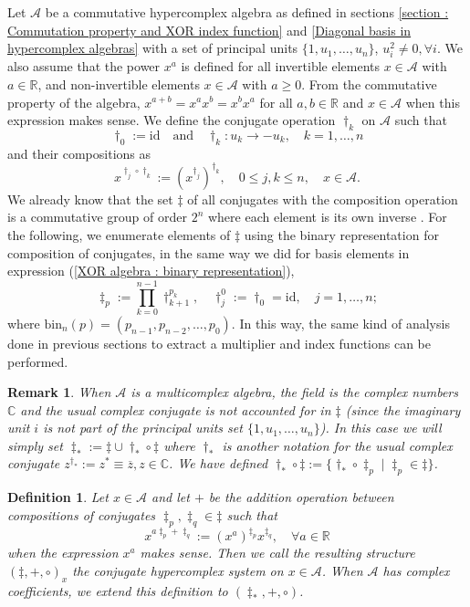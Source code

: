 \documentclass{article}
\newtheorem{definition}[theorem]{Definition}
\newtheorem{remark}[theorem]{Remark}
\begin{document}
Let $\mathcal{A}$ be a commutative hypercomplex algebra as defined in sections \ref{section : Commutation property and XOR index function} and \ref{Diagonal basis in hypercomplex algebras} with a set of principal units $\{1,u_1,\ldots,u_n\}$, $u_i^2 \neq 0, \forall i$. We also assume that the power $x^a$ is defined for all invertible elements $x \in \mathcal{A}$ with $a \in \mathbb{R}$, and non-invertible elements $x \in \mathcal{A}$ with $a \geq 0$. From the commutative property of the algebra, $x^{a+b} = x^ax^b = x^bx^a$ for all $a,b \in \mathbb{R}$ and $x \in \mathcal{A}$ when this expression makes sense.
We define the conjugate operation $\dagger_k$ on $\mathcal{A}$ such that
$$ \dagger_0 := \mathrm{id} \quad \text{and} \quad \dagger_k : u_k \rightarrow -u_k, \quad k=1,\ldots,n $$
and their compositions as
$$ x^{\dagger_j \circ \dagger_k} := (x^{\dagger_j})^{\dagger_k}, \quad 0 \leq j,k \leq n, \quad x \in \mathcal{A}. $$
We already know that the set $\ddagger$ of all conjugates with the composition operation is a commutative group of order $2^n$ where each element is its own inverse \cite{Garant-Pelletier}. For the following, we enumerate elements of $\ddagger$ using the binary representation for composition of conjugates, in the same way we did for basis elements in expression (\ref{XOR algebra : binary representation}),
\begin{equation}
    \label{Conjugate hypercomplex algebra : binary representation}
    \ddagger_p := \prod_{k=0}^{n-1} \dagger_{k+1}^{p_k}, \quad \dagger_j^0 := \dagger_0 = \mathrm{id}, \quad j = 1,\ldots,n;
\end{equation}
where $\mathrm{bin}_n(p) = (p_{n-1},p_{n-2},\ldots,p_0)$. In this way, the same kind of analysis done in previous sections to extract a multiplier and index functions can be performed. 
\begin{remark}
    When $\mathcal{A}$ is a multicomplex algebra, the field is the complex numbers $\mathbb{C}$ and the usual complex conjugate is not accounted for in $\ddagger$ (since the imaginary unit $i$ is not part of the principal units set $\{1,u_1,\ldots,u_n\}$). In this case we will simply set $\ddagger_* := \ddagger \cup \dagger_* \circ \ddagger$ where $\dagger_*$ is another notation for the usual complex conjugate $z^{\dagger_*} := z^* \equiv \overline{z}, z \in \mathbb{C}$. We have defined $\dagger_* \circ \ddagger := \{ \dagger_* \circ \ddagger_p \mid \ddagger_p \in \ddagger \}$.
\end{remark}
\begin{definition}
    \label{definition : conjugates hypercomplex algebra}
    Let $x \in \mathcal{A}$ and let $+$ be the addition operation between compositions of conjugates $\ddagger_p, \ddagger_q \in \ddagger$ such that
    $$ x^{a\ddagger_p + \ddagger_q} := (x^a)^{\ddagger_p} x^{\ddagger_q}, \quad \forall a \in \mathbb{R} $$
    when the expression $x^a$ makes sense. Then we call the resulting structure $(\ddagger, +, \circ)_x$ the conjugate hypercomplex system on $x \in \mathcal{A}$. When $\mathcal{A}$ has complex coefficients, we extend this definition to $(\ddagger_*, +, \circ)$.
\end{definition}
\end{document}
